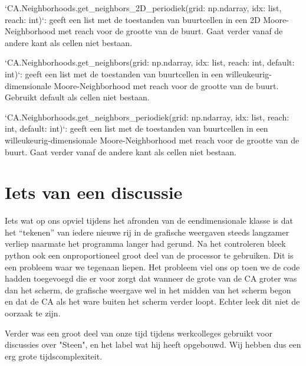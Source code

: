\documentclass{article}
\begin{document}
\begin{markdown}
`CA.Neighborhoods.get_neighbors_2D_periodiek(grid: np.ndarray, idx: list, reach: int)`: geeft een list met de toestanden van buurtcellen in een 2D Moore-Neighborhood met reach voor de grootte van de buurt. Gaat verder vanaf de andere kant als cellen niet bestaan.

`CA.Neighborhoods.get_neighbors(grid: np.ndarray, idx: list, reach: int, default: int)`: geeft een list met de toestanden van buurtcellen in een willeukeurig-dimensionale Moore-Neighborhood met reach voor de grootte van de buurt. Gebruikt default als cellen niet bestaan.

`CA.Neighborhoods.get_neighbors_periodiek(grid: np.ndarray, idx: list, reach: int, default: int)`: geeft een list met de toestanden van buurtcellen in een willeukeurig-dimensionale Moore-Neighborhood met reach voor de grootte van de buurt. Gaat verder vanaf de andere kant als cellen niet bestaan.
\end{markdown}

\section{Iets van een discussie}
Iets wat op ons opviel tijdens het afronden van de eendimensionale klasse is dat het “tekenen” van iedere nieuwe rij in de grafische weergaven steeds langzamer verliep naarmate het programma langer had gerund. Na het controleren bleek python ook een onproportioneel groot deel van de processor te gebruiken. Dit is een probleem waar we tegenaan liepen. Het probleem viel ons op toen we de code hadden toegevoegd die er voor zorgt dat wanneer de grote van de CA groter was dan het scherm, de grafische weergave wel in het midden van het scherm begon en dat de CA als het ware buiten het scherm verder loopt. Echter leek dit niet de oorzaak te zijn. 

Verder was een groot deel van onze tijd tijdens werkcolleges gebruikt voor discussies over "Steen", en het label wat hij heeft opgebouwd. Wij hebben dus een erg grote tijdscomplexiteit. 
\end{document}
